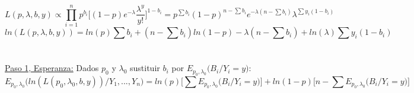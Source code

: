 $$L(p,\lambda,b,y)\propto\prod_{i=1}^{n}p^{b_i}\Big[(1-p)e^{-\lambda}\frac{\lambda^y}{y!}\Big]^{1-b_i}=p^{\sum b_i}(1-p)^{n-\sum b_i}e^{-\lambda(n-\sum b_i)}\lambda^{\sum y_i(1-b_i)}$$
$$ln(L(p,\lambda,b,y))=ln(p)\sum b_i+(n-\sum b_i)ln(1-p)-\lambda(n-\sum b_i)+ln(\lambda)\sum y_i(1-b_i)$$\\\ \\
\underline{Paso 1, Esperanza:} Dados $p_0$ y $\lambda_0$ sustituir $b_i$ por $E_{p_0,\lambda_0}\Big(B_i\Big/Y_i=y\Big)$:
$$E_{p_0,\lambda_0}\Big(ln(L(p_0,\lambda_0,b,y))\Big/Y_1,...,Y_n\Big)=ln(p)\Bigg[\sum E_{p_0,\lambda_0}\Big(B_i\Big/Y_i=y\Big)\Bigg]+ln(1-p)\Bigg[n-\sum E_{p_0,\lambda_0}\Big(B_i\Big/Y_i=y\Big)\Bigg]$$








